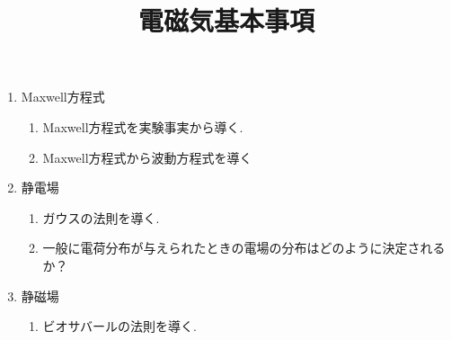 \documentclass[11pt,a4paper]{jarticle}
\title{電磁気基本事項}
\author{}
\date{}
\begin{document}
\maketitle
\begin{enumerate}
    \item Maxwell方程式
    \begin{enumerate}
        \item Maxwell方程式を実験事実から導く.
        \item Maxwell方程式から波動方程式を導く
    \end{enumerate}
    \item 静電場
    \begin{enumerate}
        \item ガウスの法則を導く.
        \item 一般に電荷分布が与えられたときの電場の分布はどのように決定されるか？
    \end{enumerate}
    \item 静磁場
    \begin{enumerate}
        \item ビオサバールの法則を導く.
    \end{enumerate}
\end{enumerate}
\end{document}
